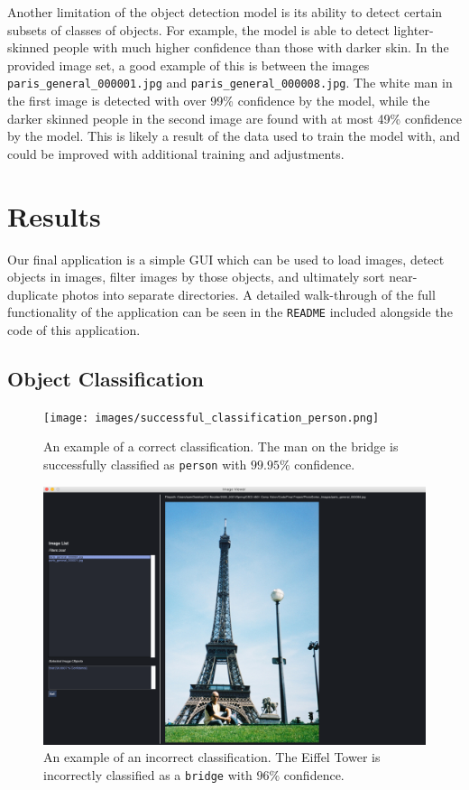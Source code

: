 \documentclass[12pt]{article}
\begin{document}
	Another limitation of the object detection model is its ability to detect certain subsets of classes of objects. For example, the model is able to detect lighter-skinned people with much higher confidence than those with darker skin. In the provided image set, a good example of this is between the images \texttt{paris\_general\_000001.jpg} and \texttt{paris\_general\_000008.jpg}. The white man in the first image is detected with over 99\% confidence by the model, while the darker skinned people in the second image are found with at most 49\% confidence by the model. This is likely a result of the data used to train the model with, and could be improved with additional training and adjustments.
	
\section{Results}

Our final application is a simple GUI which can be used to load images, detect objects in images, filter images by those objects, and ultimately sort near-duplicate photos into separate directories. A detailed walk-through of the full functionality of the application can be seen in the \texttt{README} included alongside the code of this application.


\subsection{Object Classification}
\begin{figure}[H]
	\centering
	\texttt{[image: images/successful\_classification\_person.png]}
	\caption{An example of a correct classification. The man on the bridge is successfully classified as \texttt{person} with $99.95\%$ confidence.}
	\label{fig:correct_classification}
\end{figure}


\begin{figure}[H]
	\centering
	\includegraphics[width=.9\textwidth]{images/incorrect_classification_boat.png}
	\caption{An example of an incorrect classification. The Eiffel Tower is incorrectly classified as a \texttt{bridge} with $96\%$ confidence.}
	\label{fig:incorrect_classification}
\end{figure}
\end{document}
